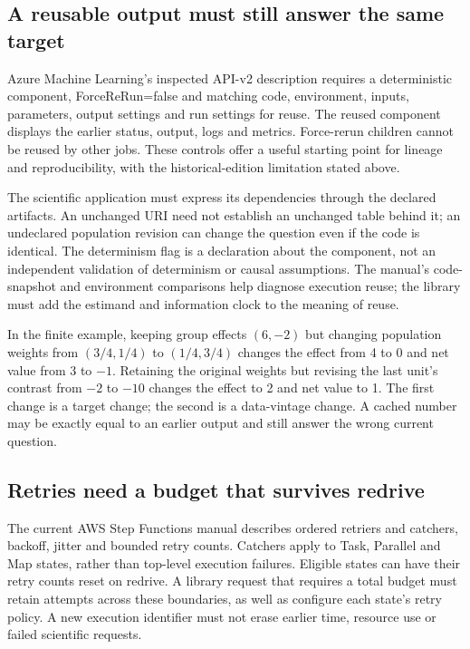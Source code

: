 \subsection{A reusable output must still answer the same target}

Azure Machine Learning's inspected API-v2 description requires a deterministic
component, ForceReRun=false and matching code, environment, inputs, parameters,
output settings and run settings for reuse. The reused component displays the
earlier status, output, logs and metrics. Force-rerun children cannot be reused
by other jobs. These controls offer a useful starting point for lineage and
reproducibility, with the historical-edition limitation stated above.
\citep{exec22_workflow_azure_reuse}

The scientific application must express its dependencies through the declared
artifacts. An unchanged URI need not establish an unchanged table behind it;
an undeclared population revision can change the question even if the code
is identical. The determinism flag is a declaration about the component, not
an independent validation of determinism or causal assumptions. The manual's
code-snapshot and environment comparisons help diagnose execution reuse; the
library must add the estimand and information clock to the meaning of reuse.
\citep{exec22_workflow_azure_reuse}

In the finite example, keeping group effects $(6,-2)$ but changing population
weights from $(3/4,1/4)$ to $(1/4,3/4)$ changes the effect from 4 to 0 and net
value from 3 to $-1$. Retaining the original weights but revising the last
unit's contrast from $-2$ to $-10$ changes the effect to 2 and net value to 1.
The first change is a target change; the second is a data-vintage change.
A cached number may be exactly equal to an earlier output and still answer
the wrong current question.\citep{exec22_workflow_reference}

\subsection{Retries need a budget that survives redrive}

The current AWS Step Functions manual describes ordered retriers and catchers,
backoff, jitter and bounded retry counts. Catchers apply to Task, Parallel and
Map states, rather than top-level execution failures. Eligible states can have
their retry counts reset on redrive. A library request that requires a total
budget must retain attempts across these boundaries, as well as configure each
state's retry policy. A new execution identifier must not erase earlier time,
resource use or failed scientific requests.
\citep{exec22_workflow_aws_errors}

